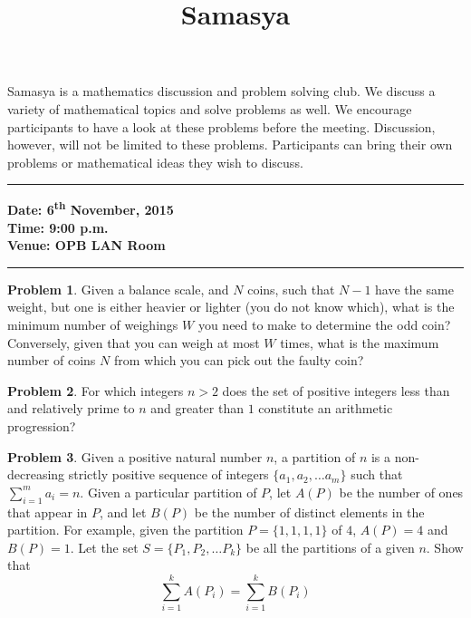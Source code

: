 \documentclass[10pt,a4paper,notitlepage]{article}
\title{\textrm{\textbf{\fontsize{30}{40}\selectfont Samasya}}}
\date{%
    }
\theoremstyle{definition}
\newtheorem{prob}{Problem}
\begin{document}
\maketitle

Samasya is a mathematics discussion and problem solving club.
We discuss a variety of mathematical topics and solve problems as well.
We encourage participants to have a look at these problems%
before the meeting.
Discussion, however, will not be limited to these problems.
Participants can bring their own problems or mathematical ideas they wish to discuss.\\
\hrule

\textbf{Date: 6\textsuperscript{th} November, 2015}%
\\
\textbf{Time: 9:00 p.m.}%
\\
\textbf{Venue: OPB LAN Room}%
\\
\hrule


\begin{prob}
Given a balance scale, and $N$ coins, such that $N-1$ have the same weight, but one is either heavier or lighter (you do not know which), what is the minimum number of weighings $W$ you need to make to determine the odd coin? Conversely, given that you can weigh at most $W$ times, what is the maximum number of coins $N$ from which you can pick out the faulty coin?
\end{prob}

\begin{prob}
For which integers $n>2$ does the set of positive integers less than and relatively prime to $n$ and greater than $1$ constitute an arithmetic progression?
\end{prob}

\begin{prob}
Given a positive natural number $n$, a partition of $n$ is a non-decreasing strictly positive sequence of integers $\{a_1, a_2, \ldots a_m\}$ such that $\sum_{i=1}^{m}a_i = n$. Given a particular partition of $P$, let $A(P)$ be the number of ones that appear in $P$, and let $B(P)$ be the number of distinct elements in the partition. For example, given the partition $P = \{1,1,1,1\}$ of $4$, $A(P)=4$ and $B(P) = 1$. Let the set $S = \{P_1, P_2, \ldots P_k\}$ be all the partitions of a given $n$. Show that
$$\sum_{i=1}^{k} A(P_i) = \sum_{i=1}^{k} B(P_i)$$
\end{prob}
\end{document}
